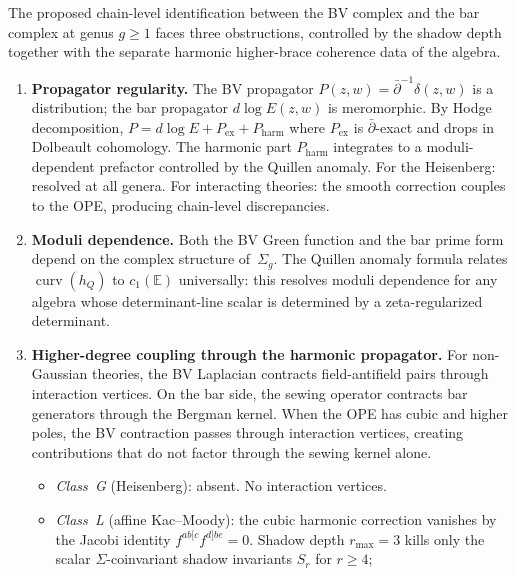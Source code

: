 \begin{proposition}
\label{prop:chain-level-three-obstructions}
The proposed chain-level identification between the BV complex and
the bar complex at genus $g \geq 1$
faces three obstructions, controlled by the shadow depth together
with the separate harmonic higher-brace coherence data of the
algebra.
\begin{enumerate}[label=\textup{(\arabic*)},nosep]
\item \textbf{Propagator regularity.}
 The BV propagator $P(z,w) = \bar\partial^{-1}\delta(z,w)$
 is a distribution; the bar propagator
 $d\log E(z,w)$ is meromorphic.
 By Hodge decomposition, $P = d\log E + P_{\mathrm{ex}}
 + P_{\mathrm{harm}}$
 where $P_{\mathrm{ex}}$ is $\bar\partial$-exact
 and drops in Dolbeault cohomology.
 The harmonic part $P_{\mathrm{harm}}$ integrates to a
 moduli-dependent prefactor controlled by the Quillen anomaly.
 For the Heisenberg: resolved at all genera.
 For interacting theories: the smooth correction couples to
 the OPE, producing chain-level discrepancies.
\item \textbf{Moduli dependence.}
 Both the BV Green function and the bar prime form
 depend on the complex structure of~$\Sigma_g$.
 The Quillen anomaly formula relates
 $\operatorname{curv}(h_Q)$ to $c_1(\mathbb{E})$
 universally: this resolves moduli dependence for any algebra
 whose determinant-line scalar is determined by a zeta-regularized
 determinant.
\item \textbf{Higher-degree coupling through the harmonic propagator.}
 For non-Gaussian theories, the BV Laplacian contracts
 field-antifield pairs through interaction vertices.
 On the bar side, the sewing operator contracts bar
 generators through the Bergman kernel.
 When the OPE has cubic and higher poles, the BV contraction
 passes through interaction vertices, creating contributions
 that do not factor through the sewing kernel alone.
 \begin{itemize}[nosep]
 \item \emph{Class~G} \textup{(}Heisenberg\textup{)}: absent.
 No interaction vertices.
 \item \emph{Class~L} \textup{(}affine Kac--Moody\textup{)}:
 the cubic harmonic correction vanishes by the Jacobi identity
 $f^{ab[c}f^{d]be} = 0$.
 Shadow depth $r_{\max} = 3$ kills only the scalar
 $\Sigma$-coinvariant shadow invariants \(S_r\) for \(r\geq4\);

\end{itemize}
\end{enumerate}
\end{proposition}
